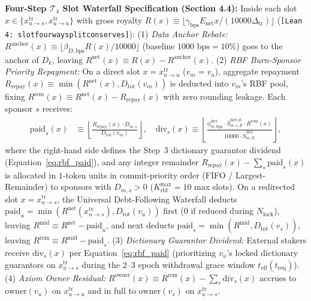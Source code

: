 \documentclass[runningheads,a4paper]{llncs}
\renewcommand{\_}{\textunderscore\allowbreak}
\newcommand{\leanref}[1]{{\footnotesize\texttt{[Lean 4: #1]}}}
\begin{document}
\textbf{Four-Step $\mathcal{T}_4$ Slot Waterfall Specification (Section 4.4):} Inside each slot $x \in \{x_{u \to s}^{\text{tr}},\allowbreak x_{u \to u}^{\text{tr}}\}$ with gross royalty $R(x) \equiv \lfloor \gamma_{\text{bps}} E_{\text{net}} x / (10000 \Delta_{\text{tr}}) \rfloor$ (\leanref{slot\_four\_way\_split\_conserves}): (1) \emph{Data Anchor Rebate:} $R^{\text{anchor}}(x) \equiv \lfloor \beta_{D,\text{bps}} R(x) / 10000 \rfloor$ (baseline $1000\text{ bps} = 10\%$) goes to the anchor of $D_k$, leaving $R^{\text{net}}(x) \equiv R(x) - R^{\text{anchor}}(x)$. (2) \emph{RBF Burn-Sponsor Priority Repayment:} On a direct slot $x = x_{u \to u}^{\text{tr}}$ ($v_m = v_u$), aggregate repayment $R_{\text{repay}}(x) \equiv \min(R^{\text{net}}(x),\allowbreak D_{\text{tot}}(v_m))$ is deducted into $v_m$'s RBF pool, fixing $R^{\text{rem}}(x) \equiv R^{\text{net}}(x) - R_{\text{repay}}(x)$ with zero rounding leakage. Each sponsor $s$ receives:
\begin{equation}
\label{eq:rbf_paid}
\begin{aligned}
\text{paid}_s(x) &\equiv \left\lfloor \frac{R_{\text{repay}}(x) \cdot D_{m,s}}{D_{\text{tot}}(v_m)} \right\rfloor, \quad
\text{div}_s(x) \equiv \left\lfloor \frac{\phi_{m,\text{bps}}^{\text{dict}} \cdot \overline{S}_{m,s,E}^{\text{dict,st}} \cdot R^{\text{rem}}(x)}{10000 \cdot \overline{S}_{m,E}^{\text{dict}}} \right\rfloor,
\end{aligned}
\end{equation}
where the right-hand side defines the Step~3 dictionary guarantor dividend (Equation~\eqref{eq:rbf_paid}), and any integer remainder $R_{\text{repay}}(x) - \sum_s \text{paid}_s(x)$ is allocated in $1\text{-token}$ units in commit-priority order (FIFO / Largest-Remainder) to sponsors with $D_{m,s} > 0$ ($K_{\text{rbf}}^{\max} = 10$ max slots). On a redirected slot $x = x_{u \to s}^{\text{tr}}$, the Universal Debt-Following Waterfall deducts $\text{paid}_u = \min(R^{\text{net}}(x_{u \to s}^{\text{tr}}),\allowbreak D_{\text{tot}}(v_u))$ first ($0$ if reduced during $N_{\text{lock}}$), leaving $R^{\text{mid}} \equiv R^{\text{net}} - \text{paid}_u$, and next deducts $\text{paid}_s = \min(R^{\text{mid}},\allowbreak D_{\text{tot}}(v_s))$, leaving $R^{\text{rem}} \equiv R^{\text{mid}} - \text{paid}_s$. (3) \emph{Dictionary Guarantor Dividend:} External stakers receive $\text{div}_s(x)$ per Equation~\eqref{eq:rbf_paid} (prioritizing $v_u$'s locked dictionary guarantors on $x_{u \to s}^{\text{tr}}$ during the $2\text{--}3$ epoch withdrawal grace window $t_{\text{eff}}(t_{\text{req}})$). (4) \emph{Axiom Owner Residual:} $R^{\text{owner}}(x) \equiv R^{\text{rem}}(x) - \sum_s \text{div}_s(x)$ accrues to $\text{owner}(v_u)$ on $x_{u \to u}^{\text{tr}}$ and in full to $\text{owner}(v_s)$ on $x_{u \to s}^{\text{tr}}$.
\end{document}
